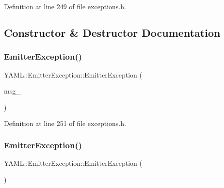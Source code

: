 Definition at line 249 of file exceptions.\+h.



\subsection{Constructor \& Destructor Documentation}
\mbox{\label{class_y_a_m_l_1_1_emitter_exception_ae5cf71bfcafe94019257f5ce795ed413}} 
\subsubsection{\texorpdfstring{EmitterException()}{EmitterException()}\hspace{0.1cm}{\footnotesize\ttfamily [1/2]}}
{\footnotesize\ttfamily Y\+A\+M\+L\+::\+Emitter\+Exception\+::\+Emitter\+Exception (\begin{DoxyParamCaption}\item[{const \mbox{\hyperlink{glad_8h_ac83513893df92266f79a515488701770}{std\+::string}} \&}]{msg\+\_\+ }\end{DoxyParamCaption})\hspace{0.3cm}{\ttfamily [inline]}}



Definition at line 251 of file exceptions.\+h.

\mbox{\label{class_y_a_m_l_1_1_emitter_exception_ae482e8c4c2d72c46712e6da0a1209ce5}} 
\subsubsection{\texorpdfstring{EmitterException()}{EmitterException()}\hspace{0.1cm}{\footnotesize\ttfamily [2/2]}}
{\footnotesize\ttfamily Y\+A\+M\+L\+::\+Emitter\+Exception\+::\+Emitter\+Exception (\begin{DoxyParamCaption}\item[{const \mbox{\hyperlink{class_y_a_m_l_1_1_emitter_exception}{Emitter\+Exception}} \&}]{ }\end{DoxyParamCaption})\hspace{0.3cm}{\ttfamily [default]}}

